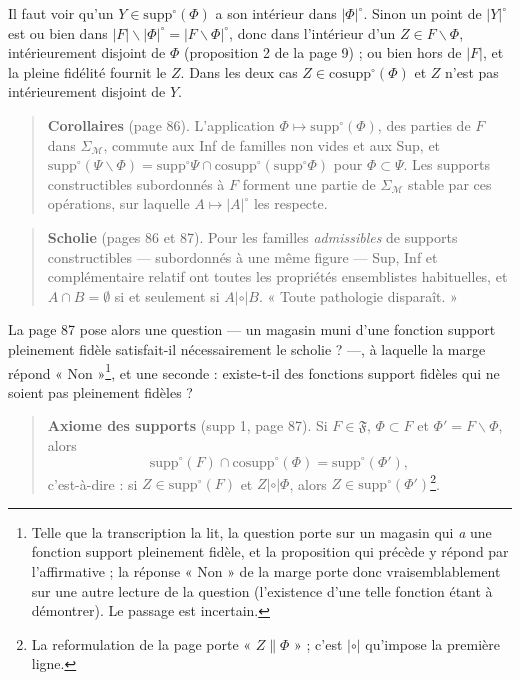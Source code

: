 \documentclass[11pt,a4paper]{article}
\begin{document}
Il faut voir qu'un $Y \in \mathrm{supp}^{\circ}(\Phi)$ a son intérieur dans
$|\Phi|^{\circ}$. Sinon un point de $|Y|^{\circ}$ est ou bien dans $|F|
\smallsetminus |\Phi|^{\circ} = |F \smallsetminus \Phi|^{\circ}$, donc dans
l'intérieur d'un $Z \in F \smallsetminus \Phi$, intérieurement disjoint de
$\Phi$ (proposition 2 de la page 9) ; ou bien hors de $|F|$, et la pleine
fidélité fournit le $Z$. Dans les deux cas $Z \in
\mathrm{cosupp}^{\circ}(\Phi)$ et $Z$ n'est pas intérieurement disjoint de $Y$.

\begin{quote}
\textbf{Corollaires} (page 86). L'application $\Phi \mapsto
\mathrm{supp}^{\circ}(\Phi)$, des parties de $F$ dans $\Sigma_{\mathcal{M}}$,
commute aux Inf de familles non vides et aux Sup, et
$\mathrm{supp}^{\circ}(\Psi \smallsetminus \Phi) = \mathrm{supp}^{\circ}\Psi \cap
\mathrm{cosupp}^{\circ}(\mathrm{supp}^{\circ}\Phi)$ pour $\Phi \subset \Psi$.
Les supports constructibles subordonnés à $F$ forment une partie de
$\Sigma_{\mathcal{M}}$ stable par ces opérations, sur laquelle $A \mapsto
|A|^{\circ}$ les respecte.
\end{quote}

\begin{quote}
\textbf{Scholie} (pages 86 et 87). Pour les familles \emph{admissibles} de
supports constructibles --- subordonnés à une même figure --- Sup, Inf et
complémentaire relatif ont toutes les propriétés ensemblistes habituelles, et
$A \cap B = \emptyset$ si et seulement si $A \mathrel{|\circ|} B$. « Toute
pathologie disparaît. »
\end{quote}

La page 87 pose alors une question --- un magasin muni d'une fonction support
pleinement fidèle satisfait-il nécessairement le scholie ? ---, à laquelle la
marge répond « Non »\footnote{Telle que la transcription la lit, la question
porte sur un magasin qui \emph{a} une fonction support pleinement fidèle, et la
proposition qui précède y répond par l'affirmative ; la réponse « Non » de la
marge porte donc vraisemblablement sur une autre lecture de la question
(l'existence d'une telle fonction étant à démontrer). Le passage est
incertain.}, et une seconde : existe-t-il des fonctions support fidèles qui ne
soient pas pleinement fidèles ?

\begin{quote}
\textbf{Axiome des supports} (supp 1, page 87). Si $F \in \mathfrak{F}$, $\Phi
\subset F$ et $\Phi' = F \smallsetminus \Phi$, alors
\[
\mathrm{supp}^{\circ}(F) \cap \mathrm{cosupp}^{\circ}(\Phi) =
\mathrm{supp}^{\circ}(\Phi') ,
\]
c'est-à-dire : si $Z \in \mathrm{supp}^{\circ}(F)$ et $Z \mathrel{|\circ|}
\Phi$, alors $Z \in \mathrm{supp}^{\circ}(\Phi')$\footnote{La reformulation de
la page porte « $Z \parallel \Phi$ » ; c'est $\mathrel{|\circ|}$ qu'impose la
première ligne.}.
\end{quote}
\end{document}
